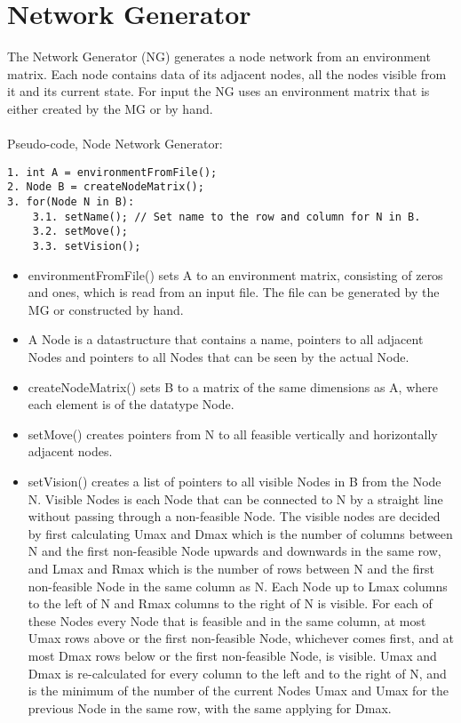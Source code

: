 \section{Network Generator}
The Network Generator (NG) generates a node network from an environment matrix. Each node contains data of its adjacent nodes, all the nodes visible from it and its current state. For input the NG uses an environment matrix that is either created by the MG or by hand.\\
\\
\noindent Pseudo-code, Node Network Generator:\\
\begin{verbatim}
1. int A = environmentFromFile();
2. Node B = createNodeMatrix();
3. for(Node N in B):
    3.1. setName(); // Set name to the row and column for N in B.
    3.2. setMove();
    3.3. setVision();
\end{verbatim}
\begin{itemize}
\item environmentFromFile() sets A to an environment matrix, consisting of zeros and ones, which is read from an input file. The file can be generated by the MG or constructed by hand.\\
\item A Node is a datastructure that contains a name, pointers to all adjacent Nodes and pointers to all Nodes that can be seen by the actual Node.\\
\item createNodeMatrix() sets B to a matrix of the same dimensions as A, where each element is of the datatype Node.\\
\item setMove() creates pointers from N to all feasible vertically and horizontally adjacent nodes.
\item setVision() creates a list of pointers to all visible Nodes in B from the Node N. Visible Nodes is each Node that can be connected to N by a straight line without passing through a non-feasible Node. The visible nodes are decided by first calculating Umax and Dmax which is the number of columns between N and the first non-feasible Node upwards and downwards in the same row, and Lmax and Rmax which is the number of rows between N and the first non-feasible Node in the same column as N. Each Node up to Lmax columns to the left of N and Rmax columns to the right of N is visible. For each of these Nodes every Node that is feasible and in the same column, at most Umax rows above or the first non-feasible Node, whichever comes first, and at most Dmax rows below or the first non-feasible Node, is visible. Umax and Dmax is re-calculated for every column to the left and to the right of N, and is the minimum of the number of the current Nodes Umax and Umax for the previous Node in the same row, with the same applying for Dmax.
\end{itemize}
